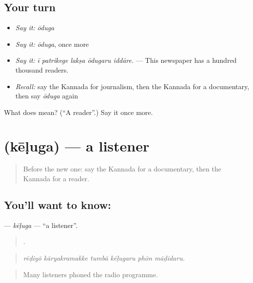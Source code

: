 \subsection*{Your turn}
\begin{itemize}
\raggedright
  \item \emph{Say it:} \emph{ōduga}
  \item \emph{Say it:} \emph{ōduga}, once more
  \item \emph{Say it:} \emph{ī patrikege lakṣa ōdugaru iddāre.} — This newspaper has a hundred thousand readers.
  \item \emph{Recall:} say the Kannada for journalism, then the Kannada for a documentary, then say \emph{ōduga} again
\end{itemize}

\begin{tcolorbox}[breakable,colback=teal!4,colframe=teal!35!black,title={Before you move on}]
What does  mean? (\textquotedblleft{}A reader\textquotedblright{}.) Say it once more.
\end{tcolorbox}
\section[\texorpdfstring{\kn{ಕೇಳುಗ} (kēḷuga)}{ಕೇಳುಗ (kēḷuga)}]{ (kēḷuga) — a listener}

\label{lesson:KA-C370-keluga}



\begin{quote}
Before the new one: say the Kannada for a documentary, then the Kannada for a reader.
\end{quote}

\subsection*{You'll want to know: }
\textbf{} — \emph{kēḷuga} — \textquotedblleft{}a listener\textquotedblright{}.

\begin{quote}
     .
\end{quote}

\begin{quote}
\emph{rēḍiyō kāryakramakke tumbā kēḷugaru phōn māḍidaru.}
\end{quote}

\begin{quote}
Many listeners phoned the radio programme.
\end{quote}

